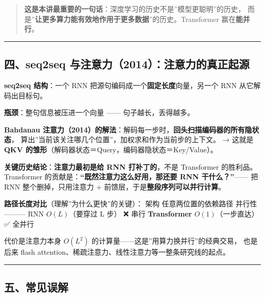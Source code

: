 \documentclass[
  chinese,
  11pt,
]{ctexart}
\begin{document}
\begin{quote}
\textbf{这是本讲最重要的一句话}：深度学习的历史不是''模型更聪明''的历史， 而是''\textbf{让更多算力能有效地作用于更多数据}''的历史。Transformer 赢在\textbf{能并行}。
\end{quote}

\begin{center}\rule{0.5\linewidth}{0.5pt}\end{center}

\subsection{四、seq2seq 与注意力（2014）：注意力的真正起源}\label{ux56dbseq2seq-ux4e0eux6ce8ux610fux529b2014ux6ce8ux610fux529bux7684ux771fux6b63ux8d77ux6e90}

\textbf{seq2seq 结构}：一个 RNN 把源句编码成一个\textbf{固定长度}向量，另一个 RNN 从它解码出目标句。

\textbf{瓶颈}：整句信息被压进一个向量 ------ 句子越长，丢得越多。

\textbf{Bahdanau 注意力（2014）的解法}：解码每一步时，\textbf{回头扫描编码器的所有隐状态}， 算出''当前该关注哪几个位置''，加权求和作为当前步的上下文。 → 这就是 \textbf{QKV 的雏形}（解码器状态＝Query，编码器隐状态＝Key/Value）。

\textbf{关键历史结论}：\textbf{注意力最初是给 RNN 打补丁的}，不是 Transformer 的胜利品。 Transformer 的贡献是：\textbf{``既然注意力这么好用，那还要 RNN 干什么？''}------ 把 RNN 整个删掉，只用注意力 + 前馈层，于是\textbf{整段序列可以并行计算}。

\textbf{路径长度对比}（理解''为什么更快''的关键）： \textbar{} 架构 \textbar{} 任意两位置的依赖路径 \textbar{} 并行性 \textbar{} \textbar---\textbar---\textbar---\textbar{} \textbar{} RNN \textbar{} \(O(L)\)（要穿过 L 步） \textbar{} ❌ 串行 \textbar{} \textbar{} \textbf{Transformer} \textbar{} \textbf{\(O(1)\)}（一步直达） \textbar{} ✅ 全并行 \textbar{}

代价是注意力本身 \(O(L^2)\) 的计算量------这是''用算力换并行''的经典交易， 也是后来 flash attention、稀疏注意力、线性注意力等一整条研究线的起点。

\begin{center}\rule{0.5\linewidth}{0.5pt}\end{center}

\subsection{五、常见误解}\label{ux4e94ux5e38ux89c1ux8befux89e3}
\end{document}
